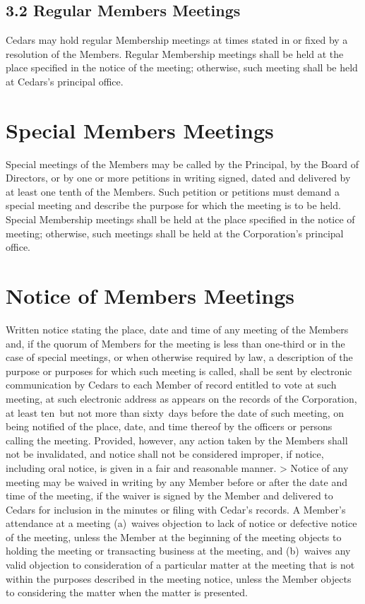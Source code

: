 \documentclass[
]{book}
\begin{document}
\subsection{3.2 Regular Members Meetings}\label{regular-members-meetings}

Cedars may hold regular Membership meetings at times stated in or
fixed by a resolution of the Members. Regular Membership meetings
shall be held at the place specified in the notice of the meeting;
otherwise, such meeting shall be held at Cedars's principal office.

\section{Special Members Meetings}\label{special-members-meetings}

Special meetings of the Members may be called by the Principal, by the
Board of Directors, or by one or more petitions in writing signed,
dated and delivered by at least one tenth of the Members. Such
petition or petitions must demand a special meeting and describe the
purpose for which the meeting is to be held. Special Membership
meetings shall be held at the place specified in the notice of
meeting; otherwise, such meetings shall be held at the Corporation's
principal office.

\section{Notice of Members Meetings}\label{notice-of-members-meetings}

Written notice stating the place, date and time of any meeting of the
Members and, if the quorum of Members for the meeting is less than
one‑third or in the case of special meetings, or when otherwise
required by law, a description of the purpose or purposes for which
such meeting is called, shall be sent by electronic communication by
Cedars to each Member of record entitled to vote at such meeting, at
such electronic address as appears on the records of the Corporation,
at least ten~but not more than sixty~days before the date of such
meeting, on being notified of the place, date, and time thereof by the
officers or persons calling the meeting. Provided, however, any action
taken by the Members shall not be invalidated, and notice shall not be
considered improper, if notice, including oral notice, is given in a
fair and reasonable manner.
\textgreater{}
Notice of any meeting may be waived in writing by any Member before or
after the date and time of the meeting, if the waiver is signed by the
Member and delivered to Cedars for inclusion in the minutes or filing
with Cedar's records. A Member's attendance at a meeting (a)~waives
objection to lack of notice or defective notice of the meeting, unless
the Member at the beginning of the meeting objects to holding the
meeting or transacting business at the meeting, and (b)~waives any
valid objection to consideration of a particular matter at the meeting
that is not within the purposes described in the meeting notice,
unless the Member objects to considering the matter when the matter is
presented.
\end{document}
